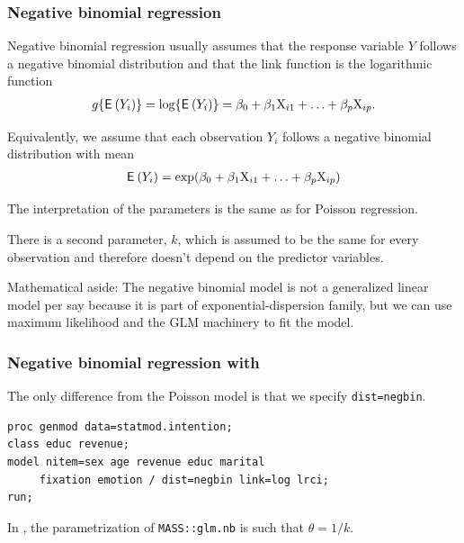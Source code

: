 \documentclass{beamer}
\begin{document}
\begin{frame}[fragile]
\frametitle{Negative binomial regression}
\bi
\item Negative binomial regression usually assumes that the response variable $Y$ 
follows a \alert{negative binomial} distribution and that the \alert{link function} is the logarithmic function 
\begin{align*}
g\{{\mathsf E}_{}\left(Y_i\right)\}=\log\{{\mathsf E}_{}\left(Y_i\right)\}=\beta_0+\beta_1\mathrm{X}_{i1}+\ldots+\beta_p\mathrm{X}_{ip}.
\end{align*}
\item Equivalently, we assume that each observation $Y_i$ follows a negative binomial distribution with mean
\begin{align*}
{\mathsf E}_{}\left(Y_i\right)=\exp(\beta_0+\beta_1\mathrm{X}_{i1}+\ldots+\beta_p\mathrm{X}_{ip})
\end{align*}
\item The interpretation of the parameters is the same as for Poisson regression. 

\item There is a second parameter, $k$, which is assumed to be \alert{the same for every observation} and therefore doesn't depend on the predictor variables.
\ei

{ \tiny Mathematical aside:
The negative binomial model is not a generalized linear model per say because it is part of exponential-dispersion family, but we can use maximum likelihood and the GLM machinery to fit the model.

}
\end{frame}



\begin{frame}[fragile]
\frametitle{Negative binomial regression with }
The only difference from the Poisson model is that we specify \texttt{dist=negbin}.
\begin{tcolorbox}[colback=white, colframe=hecblue, title=SAS code to fit a negative binomial model]
\begin{verbatim}
proc genmod data=statmod.intention;
class educ revenue;
model nitem=sex age revenue educ marital
     fixation emotion / dist=negbin link=log lrci;
run;
\end{verbatim}
\end{tcolorbox}
{\footnotesize
In \Rlang, the parametrization of \texttt{MASS::glm.nb} is such that $\theta=1/k$.


}
\end{frame}
\end{document}
